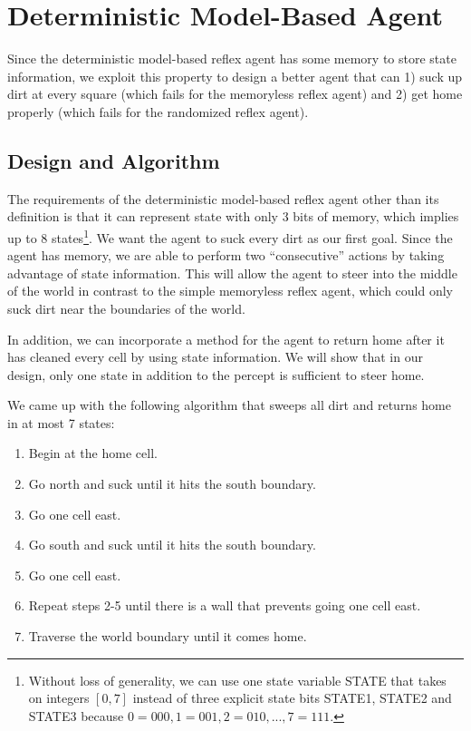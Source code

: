 \section{Deterministic Model-Based Agent}

Since the deterministic model-based reflex agent has some memory to store state information, we exploit this property to design a better agent that can 1) suck up dirt at every square (which fails for the memoryless reflex agent) and 2) get home properly (which fails for the randomized reflex agent).

\subsection{Design and Algorithm}

The requirements of the deterministic model-based reflex agent other than its definition is that it can represent state with only 3 bits of memory, which implies up to 8 states\footnote{Without loss of generality, we can use one state variable STATE that takes on integers $[0, 7]$ instead of three explicit state bits STATE1, STATE2 and STATE3 because $0 = 000, 1 = 001, 2 = 010, ..., 7 = 111$.}. We want the agent to suck every dirt as our first goal. Since the agent has memory, we are able to perform two ``consecutive'' actions by taking advantage of state information. This will allow the agent to steer into the middle of the world in contrast to the simple memoryless reflex agent, which could only suck dirt near the boundaries of the world.

In addition, we can incorporate a method for the agent to return home after it has cleaned every cell by using state information. We will show that in our design, only one state in addition to the percept is sufficient to steer home.

We came up with the following algorithm that sweeps all dirt and returns home in at most 7 states:

\begin{enumerate}
	\item Begin at the home cell.
	\item Go north and suck until it hits the south boundary. 
	\item Go one cell east.
	\item Go south and suck until it hits the south boundary.
	\item Go one cell east.
	\item Repeat steps 2-5 until there is a wall that prevents going one cell east.
	\item Traverse the world boundary until it comes home.
\end{enumerate}

